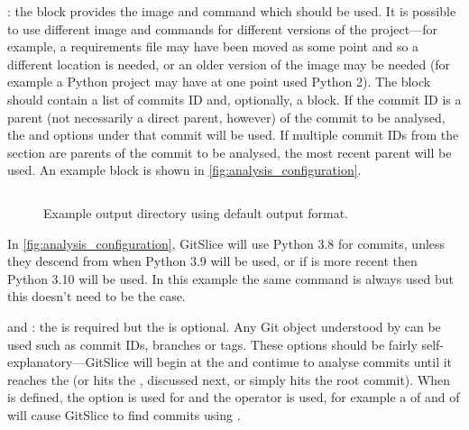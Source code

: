 \documentclass[11pt]{article}
\begin{document}
    : the  block provides the image and command which should be used.
    It is possible to use different image and commands for different versions of the project---for example, a requirements file may have been moved as some point and so a different location is needed, or an older version of the image may be needed (for example a Python project may have at one point used Python 2).
    The  block should contain a list of commits ID and, optionally, a  block.
    If the commit ID is a parent (not necessarily a direct parent, however) of the commit to be analysed, the  and  options under that commit will be used.
    If multiple commit IDs from the  section are parents of the commit to be analysed, the most recent parent will be used.
    An example block is shown in \autoref{fig:analysis_configuration}.

    \begin{figure}[H]
        \centering
        \inputminted[bgcolor=bg,frame=lines,framesep=2mm]{yaml}{./listings/sample_analysis_block.yml}
        \caption{Example output directory using default output format.}
        \label{fig:analysis_configuration}
    \end{figure}

    In \autoref{fig:analysis_configuration}, GitSlice will use Python 3.8 for commits, unless they descend from  when Python 3.9 will be used, or if  is more recent then Python 3.10 will be used.
    In this example the same command is always used but this doesn't need to be the case.

     and : the  is required but the  is optional.
    Any Git object understood by  can be used such as commit IDs, branches or tags.
    These options should be fairly self-explanatory---GitSlice will begin at the  and continue to analyse commits until it reaches the  (or hits the , discussed next, or simply hits the root commit).
    When  is defined, the  option is used for  and the  operator is used, for example a  of  and  of  will cause GitSlice to find commits using .
\end{document}
